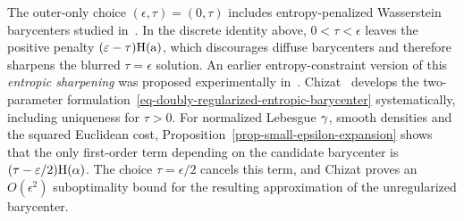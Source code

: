 The outer-only choice $(\epsilon,\tau)=(0,\tau)$ includes entropy-penalized Wasserstein barycenters studied in~\cite{BigotCazellesPapadakis2019Penalization,BigotCazellesPapadakis2019DataDriven,CarlierEichingerKroshnin2020EntropicBarycenterCLT}. In the discrete identity above, $0<\tau<\epsilon$ leaves the positive penalty $(\varepsilon-\tau)\mathrm{H}(\mathrm{a})$, which discourages diffuse barycenters and therefore sharpens the blurred $\tau=\epsilon$ solution. An earlier entropy-constraint version of this \emph{entropic sharpening} was proposed experimentally in~\cite{2015-solomon-siggraph}. Chizat~\cite{Chizat2025DoublyRegularizedBarycenter} develops the two-parameter formulation~\eqref{eq-doubly-regularized-entropic-barycenter} systematically, including uniqueness for $\tau>0$. For normalized Lebesgue $\gamma$, smooth densities and the squared Euclidean cost, Proposition~\ref{prop-small-epsilon-expansion} shows that the only first-order term depending on the candidate barycenter is $(\tau-\varepsilon/2)\mathrm H(\alpha)$. The choice $\tau=\epsilon/2$ cancels this term, and Chizat proves an $O(\epsilon^2)$ suboptimality bound for the resulting approximation of the unregularized barycenter.

